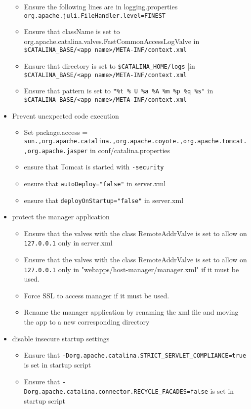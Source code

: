 \begin{itemize}
\begin{itemize}
		\item Ensure the following lines are in logging.properties \lstinline|org.apache.juli.FileHandler.level=FINEST|
		\item Ensure that className is set to org.apache.catalina.valves.FastCommonAccessLogValve in \lstinline|$CATALINA_BASE/<app name>/META-INF/context.xml|
		\item Ensure that directory is set to \lstinline|$CATALINA_HOME/logs| |in \lstinline|$CATALINA_BASE/<app name>/META-INF/context.xml|
		\item Ensure that pattern is set to \lstinline|"%t % U %a %A %m %p %q %s"| in \lstinline|$CATALINA_BASE/<app name>/META-INF/context.xml|
		\end{itemize}
	\item Prevent unexpected code execution
		\begin{itemize}
		\item Set package.access = \lstinline|sun.,org.apache.catalina.,org.apache.coyote.,org.apache.tomcat.,org.apache.jasper| in conf/catalina.properties
		\item ensure that Tomcat is started with \lstinline|-security|
		\item ensure that \lstinline|autoDeploy="false"| in server.xml
		\item ensure that \lstinline|deployOnStartup="false"| in server.xml
		\end{itemize}
	\item protect the manager application
		\begin{itemize}
		\item Ensure that the valves with the class RemoteAddrValve is set to allow on \lstinline|127.0.0.1| only in server.xml
		\item Ensure that the valves with the class RemoteAddrValve is set to allow on \lstinline|127.0.0.1| only in "webapps/host-manager/manager.xml" if it must be used.
		\item Force SSL to access manager if it must be used.
		\item Rename the manager application by renaming the xml file and moving the app to a new corresponding directory
		\end{itemize}
	\item disable insecure startup settings
		\begin{itemize}
		\item Ensure that \lstinline|-Dorg.apache.catalina.STRICT_SERVLET_COMPLIANCE=true| is set in startup script
		\item Ensure that \lstinline|-Dorg.apache.catalina.connector.RECYCLE_FACADES=false| is set in startup script

\end{itemize}
\end{itemize}
